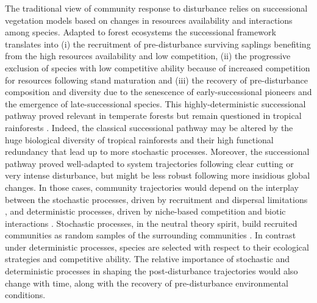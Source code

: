 \documentclass[
  11pt,
  french,
  A4paper,
  extrafontsizes,onecolumn,openright
  ]{memoir}
\begin{document}
The traditional view of community response to disturbance relies on
successional vegetation models \autocite{Clements1916} based on changes
in resources availability and interactions among species. Adapted to
forest ecosystems the successional framework translates into
\autocite{Denslow2000} (i) the recruitment of pre-disturbance surviving
saplings benefiting from the high resources availability and low
competition, (ii) the progressive exclusion of species with low
competitive ability because of increased competition for resources
following stand maturation and (iii) the recovery of pre-disturbance
composition and diversity due to the senescence of early-successional
pioneers and the emergence of late-successional species. This
highly-deterministic successional pathway proved relevant in temperate
forests but remain questioned in tropical rainforests
\autocite{Norden2015}. Indeed, the classical successional pathway may be
altered by the huge biological diversity of tropical rainforests and
their high functional redundancy that lead up to more stochastic
processes. Moreover, the successional pathway proved well-adapted to
system trajectories following clear cutting or very intense disturbance,
but might be less robust following more insidious global changes. In
those cases, community trajectories would depend on the interplay
between the stochastic processes, driven by recruitment and dispersal
limitations \autocite{Hubbell2001}, and deterministic processes, driven
by niche-based competition and biotic interactions \autocite{Adler2007}.
Stochastic processes, in the neutral theory spirit, build recruited
communities as random samples of the surrounding communities
\autocites{Hubbell2001}{Chave2004}. In contrast under deterministic
processes, species are selected with respect to their ecological
strategies and competitive ability. The relative importance of
stochastic and deterministic processes in shaping the post-disturbance
trajectories would also change with time, along with the recovery of
pre-disturbance environmental conditions.
\end{document}
